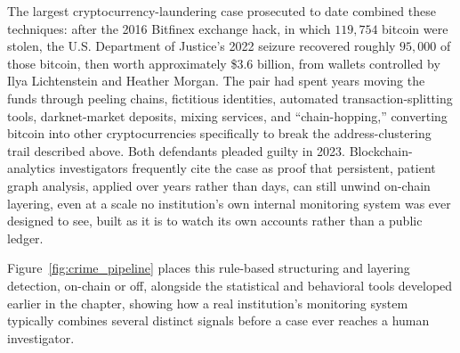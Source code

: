 \documentclass[../ai_in_finance]{subfiles}
\begin{document}
The largest cryptocurrency-laundering case prosecuted to date combined these techniques: after the 2016 Bitfinex exchange hack, in which $119{,}754$ bitcoin were stolen, the U.S. Department of Justice's 2022 seizure recovered roughly $95{,}000$ of those bitcoin, then worth approximately \$3.6 billion, from wallets controlled by Ilya Lichtenstein and Heather Morgan. The pair had spent years moving the funds through peeling chains, fictitious identities, automated transaction-splitting tools, darknet-market deposits, mixing services, and ``chain-hopping,'' converting bitcoin into other cryptocurrencies specifically to break the address-clustering trail described above. Both defendants pleaded guilty in 2023. Blockchain-analytics investigators frequently cite the case as proof that persistent, patient graph analysis, applied over years rather than days, can still unwind on-chain layering, even at a scale no institution's own internal monitoring system was ever designed to see, built as it is to watch its own accounts rather than a public ledger.

Figure~\ref{fig:crime_pipeline} places this rule-based structuring and layering detection, on-chain or off, alongside the statistical and behavioral tools developed earlier in the chapter, showing how a real institution's monitoring system typically combines several distinct signals before a case ever reaches a human investigator.

\begin{figure}[htbp]
\centering
\begin{lrbox}{\bookmeasuredbox}
\end{lrbox}
\ifdim\wd\bookmeasuredbox<0.65\linewidth
\setlength{\bookcapwidth}{0.65\linewidth}
\else
\setlength{\bookcapwidth}{\wd\bookmeasuredbox}
\fi
{}
\end{figure}
\end{document}
